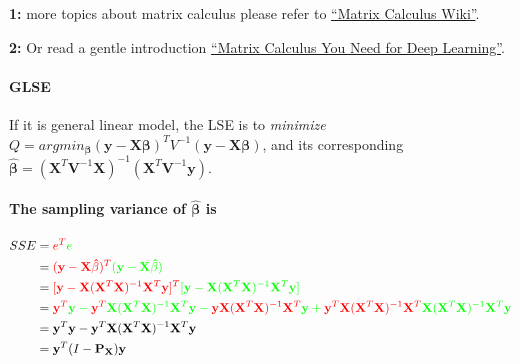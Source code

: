 \documentclass[]{article}
\let\oldparagraph\paragraph
\renewcommand{\paragraph}[1]{\oldparagraph{#1}\mbox{}}
\begin{document}
\textbf{1:} more topics about matrix calculus please refer to
\href{https://en.wikipedia.org/wiki/Matrix_calculus\#Derivatives_with_vectors}{``Matrix
Calculus Wiki''}.

\textbf{2:} Or read a gentle introduction
\href{https://arxiv.org/abs/1802.01528}{``Matrix Calculus You Need for
Deep Learning''}.

\hypertarget{glse}{%
\paragraph{GLSE}\label{glse}}

If it is general linear model, the LSE is to \emph{minimize}
\(Q=argmin_{\mathbf{\beta}}{(\mathbf{y}-\mathbf{X\beta})^TV^{-1}(\mathbf{y}-\mathbf{X\beta})}\),
and its corresponding
\(\hat{\mathbf{\beta}}=(\mathbf{X}^T\mathbf{V}^{-1}\mathbf{X})^{-1}(\mathbf{X}^T\mathbf{V}^{-1}\mathbf{y})\).

\hypertarget{the-sampling-variance-of-hatmathbfbeta-is}{%
\paragraph{\texorpdfstring{The sampling variance of
\(\hat{\mathbf{\beta}}\)
is}{The sampling variance of \textbackslash{}hat\{\textbackslash{}mathbf\{\textbackslash{}beta\}\} is}}\label{the-sampling-variance-of-hatmathbfbeta-is}}

\begin{align}
SSE&=\color{red}{e^T}\color{green}{e}\\
&=\color{red}{(\mathbf{y}-\mathbf{X\hat{\beta}})^T}\color{green}{(\mathbf{y}-\mathbf{X\hat{\beta}})}\\
&=\color{red}{[\mathbf{y}-\mathbf{X}(\mathbf{X}^T\mathbf{X})^{-1}\mathbf{X}^{T}\mathbf{y}]^T}\color{green}{[\mathbf{y}-\mathbf{X}(\mathbf{X}^T\mathbf{X})^{-1}\mathbf{X}^T\mathbf{y}]}\\
&=\color{red}{\mathbf{y}^T}\color{green}{\mathbf{y}}-\color{red}{\mathbf{y}^T}\color{green}{\mathbf{X}(\mathbf{X}^T\mathbf{X})^{-1}\mathbf{X}^T\mathbf{y}}-\color{red}{\mathbf{y}{\mathbf{X}(\mathbf{X}^T\mathbf{X})^{-1}\mathbf{X}^T}}\color{green}{\mathbf{y}}+\color{red}{\mathbf{y}^T\mathbf{X}(\mathbf{X}^T\mathbf{X})^{-1}\mathbf{X}^{T}}\color{green}{\mathbf{X}(\mathbf{X}^T\mathbf{X})^{-1}\mathbf{X}^{T}\mathbf{y}}\\
&=\mathbf{y}^T\mathbf{y}-\mathbf{y}^T\mathbf{X}(\mathbf{X}^T\mathbf{X})^{-1}\mathbf{X}^T\mathbf{y}\\
&=\mathbf{y}^T(I-\mathbf{P}_{\mathbf{X}})\mathbf{y}
\end{align}
\end{document}
